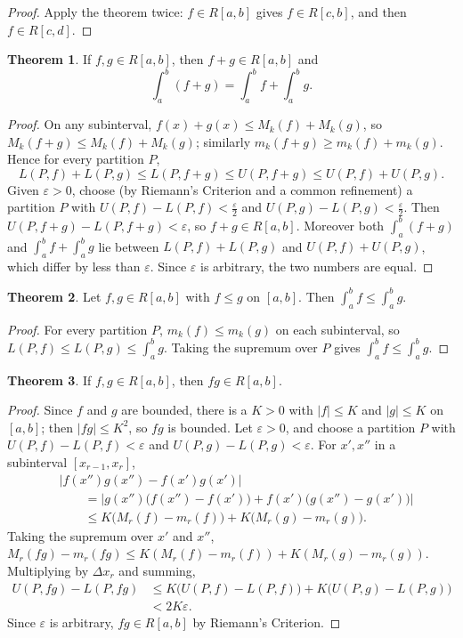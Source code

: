\documentclass[11pt,a4paper]{article}
\numberwithin{equation}{section}
\theoremstyle{definition}
\newtheorem{thm}{Theorem}[subsection]
\begin{document}
\begin{proof}
Apply the theorem twice: $f\in R[a,b]$ gives $f\in R[c,b]$, and then $f\in R[c,d]$.
\end{proof}


\begin{thm}
If $f, g\in R[a,b]$, then $f + g\in R[a,b]$ and
$$\int^b_a(f  + g) = \int^b_af + \int^b_ag .$$
\end{thm}

\begin{proof}
On any subinterval, $f(x) + g(x)\leq M_k(f) + M_k(g)$, so $M_k(f+g)\leq M_k(f) + M_k(g)$; similarly $m_k(f+g)\geq m_k(f) + m_k(g)$. Hence for every partition $P$,
$$L(P,f) + L(P,g)\leq L(P,f+g)\leq U(P,f+g)\leq U(P,f) + U(P,g).$$
Given $\varepsilon>0$, choose (by Riemann's Criterion and a common refinement) a partition $P$ with $U(P,f) - L(P,f)<\frac{\varepsilon}{2}$ and $U(P,g) - L(P,g)<\frac{\varepsilon}{2}$. Then $U(P,f+g) - L(P,f+g)<\varepsilon$, so $f+g\in R[a,b]$. Moreover both $\int_a^b(f+g)$ and $\int_a^bf + \int_a^bg$ lie between $L(P,f) + L(P,g)$ and $U(P,f) + U(P,g)$, which differ by less than $\varepsilon$. Since $\varepsilon$ is arbitrary, the two numbers are equal.
\end{proof}


\begin{thm}
Let $f,g\in R[a,b]$ with $f\leq g$ on $[a,b]$. Then $\displaystyle\int^b_a f\leq \int^b_ag$.
\end{thm}

\begin{proof}
For every partition $P$, $m_k(f)\leq m_k(g)$ on each subinterval, so $L(P,f)\leq L(P,g)\leq\int_a^bg$. Taking the supremum over $P$ gives $\int_a^b f\leq\int_a^bg$.
\end{proof}


\begin{thm}\label{thm:productint}
If $f, g\in R[a,b]$, then $fg\in R[a,b]$.
\end{thm}

\begin{proof}
Since $f$ and $g$ are bounded, there is a $K> 0$ with $|f|\leq K$ and $|g|\leq K$ on $[a,b]$; then $|fg|\leq K^2$, so $fg$ is bounded. Let $\varepsilon>0$, and choose a partition $P$ with $U(P,f) - L(P,f) <\varepsilon$ and $U(P,g) - L(P,g)<\varepsilon$. For $x', x''$ in a subinterval $[x_{r - 1}, x_r]$,
\begin{align*}
&|f(x'')g(x'') - f(x')g(x')|\\
&\qquad = \bigl|g(x'')\bigl(f(x'') - f(x')\bigr) + f(x')\bigl(g(x'') - g(x')\bigr)\bigr|\\
&\qquad \leq K \bigl(M_r(f) - m_r(f)\bigr) + K \bigl(M_r(g) - m_r(g)\bigr) .
\end{align*}
Taking the supremum over $x'$ and $x''$, $M_r(fg) - m_r(fg)\leq K(M_r(f) - m_r(f)) + K(M_r(g) - m_r(g))$. Multiplying by $\Delta x_r$ and summing,
\begin{align*}
U(P,fg) - L(P,fg) &\leq K\bigl(U(P,f) - L(P,f)\bigr) + K\bigl(U(P,g) - L(P,g)\bigr)\\
&< 2K\varepsilon .
\end{align*}
Since $\varepsilon$ is arbitrary, $fg\in R[a,b]$ by Riemann's Criterion.
\end{proof}
\end{document}
